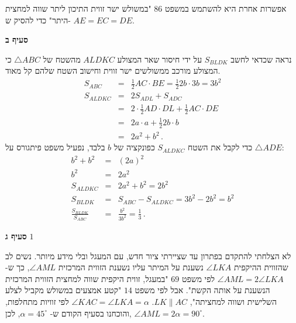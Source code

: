\documentclass[12pt,a4paper]{article}
\begin{document}
אפשרות אחרת היא להשתמש במשפט
$86$
"במשולש ישר זווית התיכון ליתר שווה למחצית היתר" כדי להסיק ש-%
$AE=EC=DE$.

\textbf{סעיף ב}

נראה שכדאי לחשב 
$S_{BLDK}$
על ידי חיסור שאר המצולע
$ALDKC$
מהשטח של
$\triangle ABC$
כי המצולע מורכב ממשולשים ישר זווית וחישוב השטח שלהם קל מאוד.
\begin{eqnarray*}
S_{ABC}&=&\frac{1}{2}AC\cdot BE= \frac{1}{2}2b\cdot 3b=3b^2\\
S_{ALDKC}&=&2S_{ADL}+S_{ADC}\\
&=&2\cdot \frac{1}{2} AD\cdot DL + \frac{1}{2} AC\cdot DE\\
&=&2a\cdot a + \frac{1}{2} 2b \cdot b\\
&=&2a^2+b^2\,.
\end{eqnarray*}
כדי לקבל את השטח
$S_{ALDKC}$
כפונקציה של
$b$
בלבד, נפעיל משפט פיתגורס על
$\triangle ADE$:
\begin{eqnarray*}
b^2+b^2&=&(2a)^2\\
b^2&=&2a^2\\
S_{ALDKC}&=&2a^2+b^2=2b^2\\
S_{BLDK}&=&S_{ABC}-S_{ALDKC}=3b^2-2b^2=b^2\\
\frac{S_{BLDK}}{S_{ABC}}&=&\frac{b^2}{3b^2}=\frac{1}{3}\,.
\end{eqnarray*}

\textbf{סעיף ג}
$1$

לא הצלחתי להתקדם בפתרון עד שציירתי ציור חדש, עם המעגל ובלי מידע מיותר. נשים לב שהזווית ההיקפית
$\angle LKA$
נשענת על המיתר עליו נשענת הזווית המרכזית
$\angle AML$,
כך ש-%
$\angle AML=2\angle LKA$
לפי משפט
$69$
"במעגל, זווית היקפית שווה למחצית הזווית המרכזית הנשענת על אותה הקשת". אבל לפי משפט
$14$
"קטע אמצעים במשולש מקביל לצלע השלישית ושווה למחציתה",
$LK\|AC$.
$\angle KAC=\angle LKA=\alpha$
לפי זוויות מתחלפות, והוכחנו בסעיף הקודם ש-%
$\alpha = 45^\circ$,
לכן,
$\angle AML = 2\alpha=90^\circ$.
\end{document}
